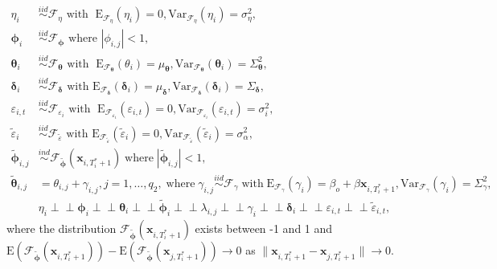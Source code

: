 \documentclass[11pt]{article}
\newcommand{\x}{\textbf{x}}
\def\mbf#1{\mathbf{#1}} %
\newcommand{\simiid}{\stackrel{iid}{\sim}} %
\newcommand{\indep}{\perp \!\!\! \perp } %
\def\mrm#1{\mathrm{#1}} %
\def\t#1{\tilde{#1}} %
\def\mc#1{\mathcal{#1}} %
\def\mc#1{\mathcal{#1}}
\theoremstyle{definition}
\begin{document}
\begin{align*}
  \eta_i &\simiid \mc{F}_{\eta} \text{ with }  \; \mrm{E}_{\mc{F}_{\eta}}(\eta_i) = 0, \mrm{Var}_{\mc{F}_{\eta}}(\eta_i)  = \sigma^2_{\eta}, \\
  \mathbf{\phi}_i &\simiid \mc{F}_{\mathbf{\phi}} \text{ where } |\phi_{i,j}| < 1, \\
  \mathbf{\theta}_i &\simiid \mc{F}_{\mathbf{\theta}} \text{ with }  \; \mrm{E}_{\mc{F}_{\mathbf{\theta}}}(\theta_i) = \mu_{\mathbf{\theta}}, \mrm{Var}_{\mc{F}_{\mathbf{\theta}}}(\mathbf{\theta}_i)  = \Sigma^2_{\mathbf{\theta}}, \\
  \mathbf{\delta}_i &\simiid  \mc{F}_{\mathbf{\delta}} \text{ with } \mrm{E}_{\mc{F}_{\mathbf{\delta}}}(\mathbf{\delta}_i)=\mu_{\mathbf{\delta}}, \mrm{Var}_{\mc{F}_{\mathbf{\delta}}}(\mathbf{\delta}_i)=\Sigma_{\mathbf{\delta}}, \\
\varepsilon_{i,t} & \simiid  \mc{F}_{\varepsilon_i} \text{ with }  \; \mrm{E}_{\mc{F}_{\varepsilon_i}}(\varepsilon_{i,t}) = 0, \mrm{Var}_{\mc{F}_{\varepsilon_i}}(\varepsilon_{i,t})  = \sigma^2_i,  \\
\t{\varepsilon}_{i} &\simiid  \mc{F}_{\t{\varepsilon}} \text{ with }\mrm{E}_{\mc{F}_{\t{\varepsilon}}}(\t{\varepsilon}_{i})=0, \mrm{Var}_{\mc{F}_{\t{\varepsilon}}}(\t{\varepsilon}_{i})=\sigma^2_{\alpha}, \\
  \tilde{\mathbf{\phi}}_{i,j} &\overset{ind}{\sim} \mathcal{F}_{\tilde{\mathbf{\phi}}}(\x_{i,T_i^*+1}) \; \text{where} \; |\tilde{\mathbf{\phi}}_{i,j}| < 1,  \\
  \tilde{\mathbf{\theta}}_{i,j} &= \theta_{i,j} + \gamma_{i,j}, j = 1,\ldots, q_{2}, \; \text{where} \; \gamma_{i,j} \simiid \mathcal{F}_{\gamma} \; \text{with} \; \mrm{E}_{\mathcal{F}_{\gamma}}(\gamma_i) = \beta_o + \beta\mbf{x}_{i,T_i^*+1}, \mrm{Var}_{\mathcal{F}_{\gamma}}(\gamma_i) = \Sigma^2_\gamma,  \\  
&\eta_i \indep \mathbf{\phi}_i \indep \mathbf{\theta}_i \indep 
\tilde{\mathbf{\phi}}_i \indep \lambda_{i,j} \indep \gamma_i \indep \mathbf{\delta}_i \indep \varepsilon_{i,t} \indep \tilde\varepsilon_{i,t},
\end{align*}
where the distribution $\mathcal{F}_{\tilde{\mathbf{\phi}}}(\x_{i,T_i^*+1})$ exists between -1 and 1 and $\mrm{E}(\mathcal{F}_{\tilde{\mathbf{\phi}}}(\x_{i,T_i^*+1})) - \mrm{E}(\mathcal{F}_{\tilde{\mathbf{\phi}}}(\x_{j,T_i^*+1})) \to 0$ as $\|\x_{i,T_i^*+1} - \x_{j,T_i^*+1}\| \to 0$.
\end{document}
